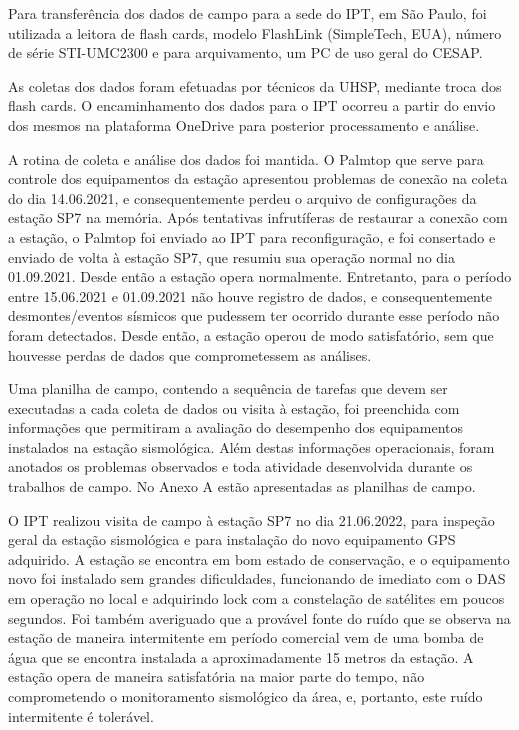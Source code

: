 \par{Para transferência dos dados de campo para a sede do IPT, em São Paulo, foi utilizada a leitora de flash cards, modelo FlashLink (SimpleTech, EUA), número de série STI-UMC2300 e para arquivamento, um PC de uso geral do CESAP.}
\par{As coletas dos dados foram efetuadas por técnicos da UHSP, mediante troca dos flash cards. O encaminhamento dos dados para o IPT ocorreu a partir do envio dos mesmos na plataforma OneDrive para posterior processamento e análise.}
\par{A rotina de coleta e análise dos dados foi mantida. O Palmtop que serve para controle dos equipamentos da estação apresentou problemas de conexão na coleta do dia 14.06.2021, e consequentemente perdeu o arquivo de configurações da estação SP7 na memória. Após tentativas infrutíferas de restaurar a conexão com a estação, o Palmtop foi enviado ao IPT para reconfiguração, e foi consertado e enviado de volta à estação SP7, que resumiu sua operação normal no dia 01.09.2021. Desde então a estação opera normalmente. Entretanto, para o período entre 15.06.2021 e 01.09.2021 não houve registro de dados, e consequentemente desmontes/eventos sísmicos que pudessem ter ocorrido durante esse período não foram detectados. Desde então, a estação operou de modo satisfatório, sem que houvesse perdas de dados que comprometessem as análises.}
\par{Uma planilha de campo, contendo a sequência de tarefas que devem ser executadas a cada coleta de dados ou visita à estação, foi preenchida com informações que permitiram a avaliação do desempenho dos equipamentos instalados na estação sismológica. Além destas informações operacionais, foram anotados os problemas observados e toda atividade desenvolvida durante os trabalhos de campo. No Anexo A estão apresentadas as planilhas de campo.}
\par{O IPT realizou visita de campo à estação SP7 no dia 21.06.2022, para inspeção geral da estação sismológica e para instalação do novo equipamento GPS adquirido. A estação se encontra em bom estado de conservação, e o equipamento novo foi instalado sem grandes dificuldades, funcionando de imediato com o DAS em operação no local e adquirindo lock com a constelação de satélites em poucos segundos. Foi também averiguado que a provável fonte do ruído que se observa na estação de maneira intermitente em período comercial vem de uma bomba de água que se encontra instalada a aproximadamente 15 metros da estação. A estação opera de maneira satisfatória na maior parte do tempo, não comprometendo o monitoramento sismológico da área, e, portanto, este ruído intermitente é tolerável.}
